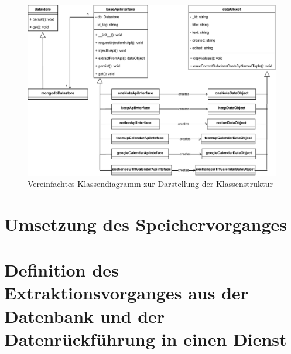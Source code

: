 \begin{figure}[H]
	\centering
	\includegraphics[width=1\textwidth]{Bilder/umsetzung/classDiagramm.pdf}
	\caption{Vereinfachtes Klassendiagramm zur Darstellung der Klassenstruktur}
	\label{fig:Klassendiagram}
\end{figure}

\section{Umsetzung des Speichervorganges}

\section{Definition des Extraktionsvorganges aus der Datenbank und der Datenrückführung in einen Dienst}